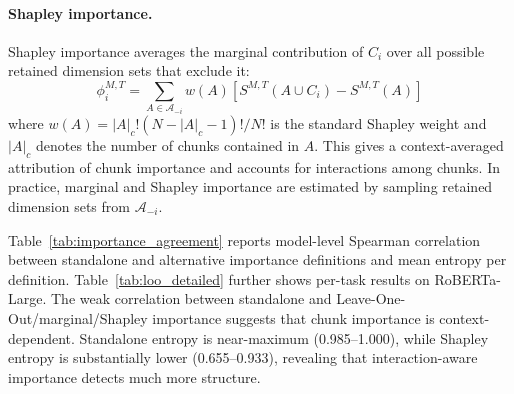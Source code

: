 \documentclass[11pt]{article}
\begin{document}
\paragraph{Shapley importance.}
Shapley importance averages the marginal contribution of $C_i$ over all possible retained dimension sets that exclude it:
\begin{equation}
\phi_i^{M,T}
=
\sum_{A\in \mathcal{A}_{-i}}
w(A)
\left[
S^{M,T}(A\cup C_i)-S^{M,T}(A)
\right]
\label{eq:shapley_importance}
\end{equation}
where $w(A)=|A|_c!(N-|A|_c-1)!/N!$ is the standard Shapley weight and $|A|_c$ denotes the number of chunks contained in $A$. This gives a context-averaged attribution of chunk importance and accounts for interactions among chunks. In practice, marginal and Shapley importance are estimated by sampling retained dimension sets from $\mathcal{A}_{-i}$.

Table~\ref{tab:importance_agreement} reports model-level Spearman correlation between standalone and alternative importance definitions and mean entropy per definition. Table~\ref{tab:loo_detailed} further shows per-task results on RoBERTa-Large. The weak correlation between standalone and Leave-One-Out/marginal/Shapley importance suggests that chunk importance is context-dependent. Standalone entropy is near-maximum (0.985--1.000), while Shapley entropy is substantially lower (0.655--0.933), revealing that interaction-aware importance detects much more structure. 


\begin{table}[h]
    \centering
    \caption{Spearman correlation between standalone and alternative importance definitions at 256 retained dimensions (chunk size $w=4$), and mean entropy per definition.}
    \label{tab:importance_agreement}
    \small
\end{table}
\end{document}
